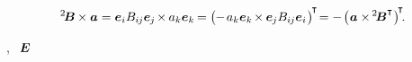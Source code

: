 \nopagebreak\vspace{-0.3em}\begin{equation*}\label{crossproductisnotcommutative}
{^2\hspace{-0.16em}\bm{B}} \hspace{-0.1ex} \times \bm{a}
= \bm{e}_i B_{i\hspace{-0.1ex}j} \bm{e}_{\hspace{-0.1ex}j} \hspace{-0.25ex} \times \hspace{-0.1ex} a_k \bm{e}_k \hspace{-0.2ex}
= \bigl( \hspace{-0.1ex} - \hspace{.25ex} a_k \bm{e}_k \hspace{-0.25ex} \times \hspace{-0.1ex} \bm{e}_{\hspace{-0.1ex}j} B_{i\hspace{-0.1ex}j} \bm{e}_i \hspace{.16ex} \bigr)^{\hspace{-0.25ex}\T} \hspace{-0.4ex}
= - \hspace{.25ex} \bigl( \hspace{.12ex} \bm{a} \times \hspace{-0.2ex} {^2\hspace{-0.16em}\bm{B}^{\T}} \hspace{.1ex} \bigr)^{\hspace{-0.3ex}\T}
\hspace{-0.4ex} .
\end{equation*}

\vspace{-0.15em} \noindent
{}, ~${\hspace{-0.2ex}\bm{E}}$ ~


